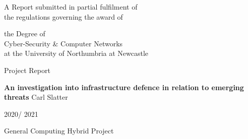 
\begin{titlepage}
\Large
A Report submitted in partial fulfilment of\\
 the regulations governing the award of
\par
the Degree of\\[5mm]
{\huge	 Cyber-Security \& Computer Networks}\\[5mm]
at the University of Northumbria at Newcastle
\par
\vspace*{1in}
{\Large Project Report}
\par\vspace{1em}
{\Huge \bfseries An investigation into infrastructure defence in relation to emerging threats}
\vfill
Carl Slatter
\par\vspace{1em}
2020/ 2021
\par\vspace{1em}
General Computing Hybrid Project
\end{titlepage}
